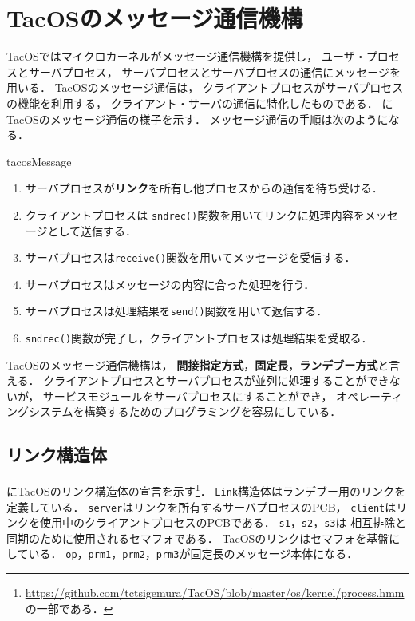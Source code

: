 \section{TacOSのメッセージ通信機構}
TacOSではマイクロカーネルがメッセージ通信機構を提供し，
ユーザ・プロセスとサーバプロセス，
サーバプロセスとサーバプロセスの通信にメッセージを用いる．
TacOSのメッセージ通信は，
クライアントプロセスがサーバプロセスの機能を利用する，
クライアント・サーバの通信に特化したものである．
にTacOSのメッセージ通信の様子を示す．
メッセージ通信の手順は次のようになる．

{tacosMessage}

\begin{enumerate}
\item サーバプロセスが{\bf リンク}を所有し他プロセスからの通信を待ち受ける．
\item クライアントプロセスは
{\tt sndrec()}関数を用いてリンクに処理内容をメッセージとして送信する．
\item サーバプロセスは{\tt receive()}関数を用いてメッセージを受信する．
\item サーバプロセスはメッセージの内容に合った処理を行う．
\item サーバプロセスは処理結果を{\tt send()}関数を用いて返信する．
\item {\tt sndrec()}関数が完了し，クライアントプロセスは処理結果を受取る．
\end{enumerate}

TacOSのメッセージ通信機構は，
{\bf 間接指定方式}，{\bf 固定長}，{\bf ランデブー方式}と言える．
クライアントプロセスとサーバプロセスが並列に処理することができないが，
サービスモジュールをサーバプロセスにすることができ，
オペレーティングシステムを構築するためのプログラミングを容易にしている．

\subsection{リンク構造体}
にTacOSのリンク構造体の宣言を示す\footnote{
\url{https://github.com/tctsigemura/TacOS/blob/master/os/kernel/process.hmm}
の一部である．}．
{\tt Link}構造体はランデブー用のリンクを定義している．
{\tt server}はリンクを所有するサーバプロセスのPCB，
{\tt client}はリンクを使用中のクライアントプロセスのPCBである．
{\tt s1}，{\tt s2}，{\tt s3}は
相互排除と同期のために使用されるセマフォである．
TacOSのリンクはセマフォを基盤にしている．
{\tt op}，{\tt prm1}，{\tt prm2}，{\tt prm3}が固定長のメッセージ本体になる．

